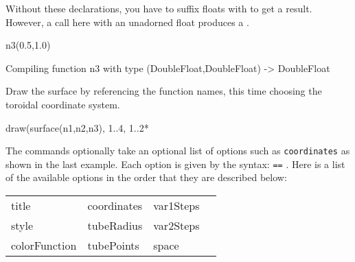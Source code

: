 \begin{xtc}
\begin{xtccomment}
Without these declarations, you have to suffix floats
with  to get a  result.
However, a call here with an unadorned float produces a .
\end{xtccomment}
\begin{spadsrc}
n3(0.5,1.0)
\end{spadsrc}
\begin{MessageOutput}
   Compiling function n3 with type (DoubleFloat,DoubleFloat) -> 
      DoubleFloat 
\end{MessageOutput}
\begin{TeXOutput}
\begin{fricasmath}{4}
%
\end{fricasmath}
\end{TeXOutput}
\end{xtc}
%
%
\begin{psXtc}
\begin{xtccomment}
Draw the surface by referencing the function names, this time
choosing the toroidal coordinate system.
\end{xtccomment}
\begin{spadsrc}
draw(surface(n1,n2,n3), 1..4, 1..2*%
\end{spadsrc}
\end{psXtc}


The  commands optionally take an optional list of options such
as {\tt coordinates} as shown in the last example.
Each option is given by the syntax:  {\tt ==} .
Here is a list of the available options in the order that they are
described below:

\begin{tabular}{llll}
title&coordinates&var1Steps\\
style&tubeRadius&var2Steps\\
colorFunction&tubePoints&space\\
\end{tabular}

